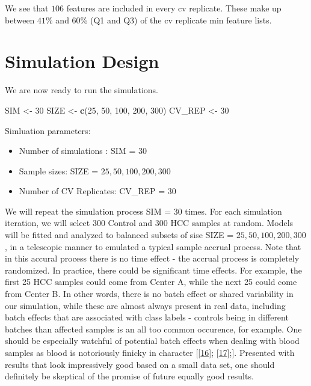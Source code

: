 \documentclass[
]{book}
\newenvironment{Shaded}{\begin{snugshade}}{\end{snugshade}}
\newcommand{\DecValTok}[1]{\textcolor[rgb]{0.00,0.00,0.81}{#1}}
\newcommand{\KeywordTok}[1]{\textcolor[rgb]{0.13,0.29,0.53}{\textbf{#1}}}
\newcommand{\NormalTok}[1]{#1}
\newcommand{\StringTok}[1]{\textcolor[rgb]{0.31,0.60,0.02}{#1}}
\begin{document}
We see that \(106\) features are included in every
cv replicate. These make up between
\(41\)\%
and
\(60\)\%
(Q1 and Q3) of the cv replicate min feature lists.

\hypertarget{simulation-design}{%
\section{Simulation Design}\label{simulation-design}}

We are now ready to run the simulations.

\begin{Shaded}
\begin{Highlighting}[]
\NormalTok{ SIM <{-}}\StringTok{ }\DecValTok{30}
\NormalTok{ SIZE <{-}}\StringTok{ }\KeywordTok{c}\NormalTok{(}\DecValTok{25}\NormalTok{, }\DecValTok{50}\NormalTok{, }\DecValTok{100}\NormalTok{, }\DecValTok{200}\NormalTok{, }\DecValTok{300}\NormalTok{)}
\NormalTok{ CV\_REP <{-}}\StringTok{ }\DecValTok{30}
\end{Highlighting}
\end{Shaded}

Simluation parameters:

\begin{itemize}
\item
  Number of simulations : SIM = \(30\)
\item
  Sample sizes: SIZE = \(25, 50, 100, 200, 300\)
\item
  Number of CV Replicates: CV\_REP = \(30\)
\end{itemize}

We will repeat the simulation process SIM = \(30\) times.
For each simulation iteration, we will select \(300\) Control and
\(300\) HCC samples at random. Models will be fitted and analyzed
to balanced subsets of sise SIZE = \(25, 50, 100, 200, 300\), in a telescopic manner to
emulated a typical sample accrual process. Note that in this accural process
there is no time effect - the accrual process is completely randomized. In practice,
there could be significant time effects. For example, the first 25 HCC samples could come
from Center A, while the next 25 could come from Center B. In other words,
there is no batch effect or shared variability in our simulation,
while these are almost always present in real data, including
batch effects that are associated with class labels - controls being in
different batches than affected samples is an all too common occurence,
for example. One should be especially watchful of potential batch effects
when dealing with blood samples as blood is notoriously finicky in
character {[}{[}\protect\hyperlink{ref-Huang:2017aa}{16}{]}; {[}\protect\hyperlink{ref-Permenter:2015aa}{17}{]};{]}.
Presented with results that look impressively good based on a small data set,
one should definitely be skeptical of the promise of future equally good results.
\end{document}
